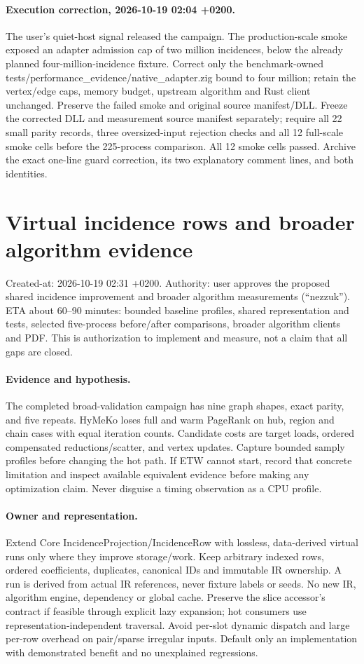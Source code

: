 \documentclass[11pt]{article}
\begin{document}
\paragraph{Execution correction, 2026-10-19 02:04 +0200.}
The user's quiet-host signal released the campaign. The production-scale smoke
exposed an adapter admission cap of two million incidences, below the already
planned four-million-incidence fixture. Correct only the benchmark-owned
tests/performance\_evidence/native\_adapter.zig bound to four million; retain the
vertex/edge caps, memory budget, upstream algorithm and Rust client unchanged.
Preserve the failed smoke and original source manifest/DLL. Freeze the corrected
DLL and measurement source manifest separately; require all 22 small parity
records, three oversized-input rejection checks and all 12 full-scale smoke cells
before the 225-process comparison. All 12 smoke cells passed. Archive the exact
one-line guard correction, its two explanatory comment lines, and both identities.

\newpage\section*{Virtual incidence rows and broader algorithm evidence}
Created-at: 2026-10-19 02:31 +0200. Authority: user approves the proposed shared
incidence improvement and broader algorithm measurements (``nezzuk''). ETA about
60--90 minutes: bounded baseline profiles, shared representation and tests,
selected five-process before/after comparisons, broader algorithm clients and PDF.
This is authorization to implement and measure, not a claim that all gaps are closed.
\paragraph{Evidence and hypothesis.} The completed broad-validation campaign has
nine graph shapes, exact parity, and five repeats. HyMeKo loses full and warm
PageRank on hub, region and chain cases with equal iteration counts. Candidate
costs are target loads, ordered compensated reductions/scatter, and vertex updates.
Capture bounded samply profiles before changing the hot path. If ETW cannot start,
record that concrete limitation and inspect available equivalent evidence before
making any optimization claim. Never disguise a timing observation as a CPU profile.
\paragraph{Owner and representation.} Extend Core IncidenceProjection/IncidenceRow
with lossless, data-derived virtual runs only where they improve storage/work.
Keep arbitrary indexed rows, ordered coefficients, duplicates, canonical IDs and
immutable IR ownership. A run is derived from actual IR references, never fixture
labels or seeds. No new IR, algorithm engine, dependency or global cache.
Preserve the slice accessor's contract if feasible through explicit lazy expansion;
hot consumers use representation-independent traversal. Avoid per-slot dynamic
dispatch and large per-row overhead on pair/sparse irregular inputs. Default only
an implementation with demonstrated benefit and no unexplained regressions.
\end{document}
